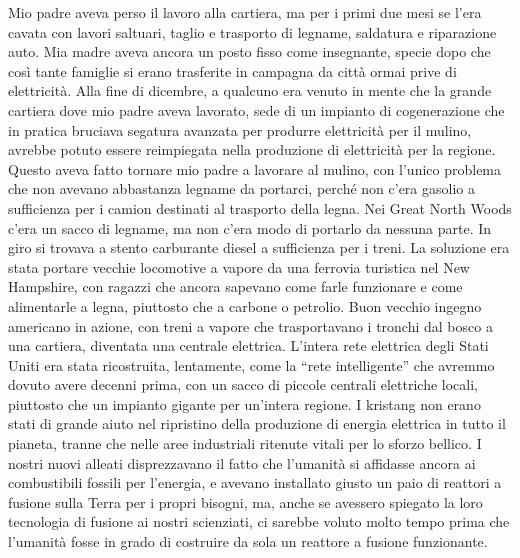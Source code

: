 Mio padre aveva perso il lavoro alla cartiera, ma per i primi due mesi
se l'era cavata con lavori saltuari, taglio e trasporto di legname,
saldatura e riparazione auto. Mia madre aveva ancora un posto fisso come
insegnante, specie dopo che così tante famiglie si erano trasferite in
campagna da città ormai prive di elettricità. Alla fine di dicembre, a
qualcuno era venuto in mente che la grande cartiera dove mio padre aveva
lavorato, sede di un impianto di cogenerazione che in pratica bruciava
segatura avanzata per produrre elettricità per il mulino, avrebbe potuto
essere reimpiegata nella produzione di elettricità per la regione.
Questo aveva fatto tornare mio padre a lavorare al mulino, con l'unico
problema che non avevano abbastanza legname da portarci, perché non
c'era gasolio a sufficienza per i camion destinati al trasporto della
legna. Nei Great North Woods c'era un sacco di legname, ma non c'era
modo di portarlo da nessuna parte. In giro si trovava a stento
carburante diesel a sufficienza per i treni. La soluzione era stata
portare vecchie locomotive a vapore da una ferrovia turistica nel New
Hampshire, con ragazzi che ancora sapevano come farle funzionare e come
alimentarle a legna, piuttosto che a carbone o petrolio. Buon vecchio
ingegno americano in azione, con treni a vapore che trasportavano i
tronchi dal bosco a una cartiera, diventata una centrale elettrica.
L'intera rete elettrica degli Stati Uniti era stata ricostruita,
lentamente, come la ``rete intelligente'' che avremmo dovuto avere
decenni prima, con un sacco di piccole centrali elettriche locali,
piuttosto che un impianto gigante per un'intera regione. I kristang non
erano stati di grande aiuto nel ripristino della produzione di energia
elettrica in tutto il pianeta, tranne che nelle aree industriali
ritenute vitali per lo sforzo bellico. I nostri nuovi alleati
disprezzavano il fatto che l'umanità si affidasse ancora ai combustibili
fossili per l'energia, e avevano installato giusto un paio di reattori a
fusione sulla Terra per i propri bisogni, ma, anche se avessero spiegato
la loro tecnologia di fusione ai nostri scienziati, ci sarebbe voluto
molto tempo prima che l'umanità fosse in grado di costruire da sola un
reattore a fusione funzionante.

